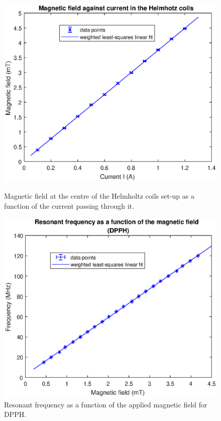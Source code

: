 \documentclass[a4paper]{jpconf}
\numberwithin{equation}{section}
\begin{document}
\begin{figure}[htbp]
	\begin{minipage}[b]{2.9in}
		\includegraphics[scale=0.6]{ESR_calibration.eps}
		\caption{Magnetic field at the centre of the Helmholtz coils set-up as a function of the current passing through it.}
		\label{fig: HC calibration curve}
	\end{minipage}
    \hspace{1.5pc}
	\begin{minipage}[b]{3in}
		\includegraphics[scale=0.6]{DPPH.eps}
		\caption{Resonant frequency as a function of the applied magnetic field for DPPH.}
		\label{fig: DPPH resonance}
	\end{minipage}
\end{figure}
\end{document}
